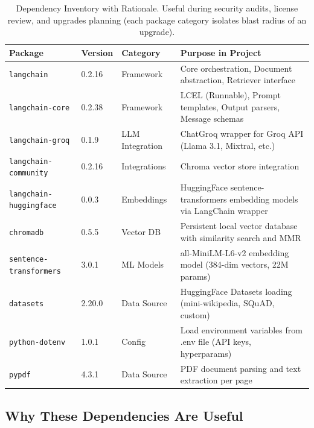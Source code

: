 \documentclass[12pt,a4paper]{article}
\begin{document}
\begin{table}[H]
\centering
\footnotesize
\begin{tabular}{@{}lllp{5.5cm}@{}}
\toprule
\textbf{Package} & \textbf{Version} & \textbf{Category} & \textbf{Purpose in Project} \\
\midrule
\texttt{langchain} & 0.2.16 & Framework & Core orchestration, Document abstraction, Retriever interface \\
\texttt{langchain-core} & 0.2.38 & Framework & LCEL (Runnable), Prompt templates, Output parsers, Message schemas \\
\texttt{langchain-groq} & 0.1.9 & LLM Integration & ChatGroq wrapper for Groq API (Llama 3.1, Mixtral, etc.) \\
\texttt{langchain-community} & 0.2.16 & Integrations & Chroma vector store integration \\
\texttt{langchain-huggingface} & 0.0.3 & Embeddings & HuggingFace sentence-transformers embedding models via LangChain wrapper \\
\texttt{chromadb} & 0.5.5 & Vector DB & Persistent local vector database with similarity search and MMR \\
\texttt{sentence-transformers} & 3.0.1 & ML Models & all-MiniLM-L6-v2 embedding model (384-dim vectors, 22M params) \\
\texttt{datasets} & 2.20.0 & Data Source & HuggingFace Datasets loading (mini-wikipedia, SQuAD, custom) \\
\texttt{python-dotenv} & 1.0.1 & Config & Load environment variables from .env file (API keys, hyperparams) \\
\texttt{pypdf} & 4.3.1 & Data Source & PDF document parsing and text extraction per page \\
\bottomrule
\end{tabular}
\caption{Dependency Inventory with Rationale. Useful during security audits, license review, and upgrades planning (each package category isolates blast radius of an upgrade).}
\label{tab:deps}
\end{table}

\subsection{Why These Dependencies Are Useful}
\end{document}
